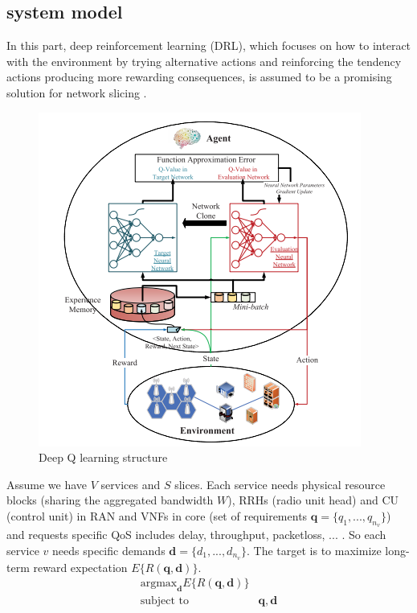 \documentclass[conference]{IEEEtran}
\begin{document}
\subsection{system model}
In this part, deep reinforcement learning (DRL), which focuses on how to interact with the environment by
trying alternative actions and reinforcing the tendency actions producing more rewarding consequences,
is assumed to be a promising solution for network slicing \cite{drl}.
\begin{figure}%
  \centering
    \includegraphics[width=\linewidth]{drl}
  \caption{Deep Q learning structure}
  \label{fig:drl}
\end{figure}
Assume we have $V$ services and $S$ slices. Each service needs physical resource blocks (sharing the aggregated bandwidth $W$), RRHs (radio unit head) and CU (control unit) in RAN and VNFs in core (set of requirements $\mathbf{q} = \{q_1, ..., q_{n_v}\}$) and requests specific QoS includes delay, throughput, packetloss, ... . 
So each service $v$ needs specific demands $\mathbf{d} = \{d_1, ..., d_{n_v}\}$.
The target is to maximize long-term reward expectation $E\{R(\mathbf{q},\mathbf{d})\}$.
\begin{subequations}
\begin{alignat}{4}
\text{argmax}_{\mathbf{d}} E\{R(\mathbf{q},\mathbf{d})\} \\
\text{subject to} \quad  & \mathbf{q} , \mathbf{d}  
\end{alignat}
\label{constraints1}
\end{subequations}
\end{document}
